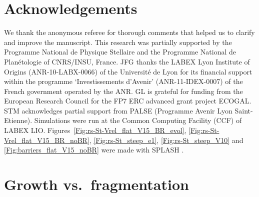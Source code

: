 \documentclass[a4paper,fleqn,usenatbib]{mnras}
\begin{document}
\section*{Acknowledgements}

We thank the anonymous referee for thorough comments that helped us to clarify and improve the manuscript.
This research was partially supported by the Programme National de Physique Stellaire and the Programme National de Plan\'etologie of CNRS/INSU, France. JFG thanks the LABEX Lyon Institute of Origins (ANR-10-LABX-0066) of the Universit\'e de Lyon for its financial support within the programme `Investissements d'Avenir' (ANR-11-IDEX-0007) of the French government operated by the ANR. GL is grateful for funding from the European Research Council for the FP7 ERC advanced grant project ECOGAL. STM acknowledges partial support from PALSE (Programme Avenir Lyon Saint-Etienne). Simulations were run at the Common Computing Facility (CCF) of LABEX LIO. Figures~\ref{Fig:rs-St-Vrel_flat_V15_BR_evol}, \ref{Fig:rs-St-Vrel_flat_V15_BR_noBR}, \ref{Fig:rs-St_steep_e1}, \ref{Fig:rs-St_steep_V10} and \ref{Fig:barriers_flat_V15_noBR} were made with SPLASH \citep{Price2007}.







\appendix
\section{Growth vs.\ fragmentation}
\label{app:LimGrowthFrag}
\end{document}
